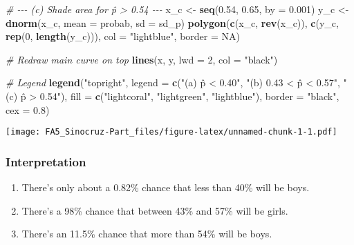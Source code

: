 \documentclass[
]{article}
\newenvironment{Shaded}{\begin{snugshade}}{\end{snugshade}}
\newcommand{\AttributeTok}[1]{\textcolor[rgb]{0.13,0.29,0.53}{#1}}
\newcommand{\CommentTok}[1]{\textcolor[rgb]{0.56,0.35,0.01}{\textit{#1}}}
\newcommand{\ConstantTok}[1]{\textcolor[rgb]{0.56,0.35,0.01}{#1}}
\newcommand{\DecValTok}[1]{\textcolor[rgb]{0.00,0.00,0.81}{#1}}
\newcommand{\FloatTok}[1]{\textcolor[rgb]{0.00,0.00,0.81}{#1}}
\newcommand{\FunctionTok}[1]{\textcolor[rgb]{0.13,0.29,0.53}{\textbf{#1}}}
\newcommand{\NormalTok}[1]{#1}
\newcommand{\OtherTok}[1]{\textcolor[rgb]{0.56,0.35,0.01}{#1}}
\newcommand{\StringTok}[1]{\textcolor[rgb]{0.31,0.60,0.02}{#1}}
\begin{document}
\begin{Shaded}
\begin{Highlighting}[]
\CommentTok{\# {-}{-}{-} (c) Shade area for p̂ \textgreater{} 0.54 {-}{-}{-}}
\NormalTok{x\_c }\OtherTok{\textless{}{-}} \FunctionTok{seq}\NormalTok{(}\FloatTok{0.54}\NormalTok{, }\FloatTok{0.65}\NormalTok{, }\AttributeTok{by =} \FloatTok{0.001}\NormalTok{)}
\NormalTok{y\_c }\OtherTok{\textless{}{-}} \FunctionTok{dnorm}\NormalTok{(x\_c, }\AttributeTok{mean =}\NormalTok{ probab, }\AttributeTok{sd =}\NormalTok{ sd\_p)}
\FunctionTok{polygon}\NormalTok{(}\FunctionTok{c}\NormalTok{(x\_c, }\FunctionTok{rev}\NormalTok{(x\_c)), }\FunctionTok{c}\NormalTok{(y\_c, }\FunctionTok{rep}\NormalTok{(}\DecValTok{0}\NormalTok{, }\FunctionTok{length}\NormalTok{(y\_c))), }\AttributeTok{col =} \StringTok{"lightblue"}\NormalTok{, }\AttributeTok{border =} \ConstantTok{NA}\NormalTok{)}

\CommentTok{\# Redraw main curve on top}
\FunctionTok{lines}\NormalTok{(x, y, }\AttributeTok{lwd =} \DecValTok{2}\NormalTok{, }\AttributeTok{col =} \StringTok{"black"}\NormalTok{)}

\CommentTok{\# Legend}
\FunctionTok{legend}\NormalTok{(}\StringTok{"topright"}\NormalTok{,}
       \AttributeTok{legend =} \FunctionTok{c}\NormalTok{(}\StringTok{"(a) p̂ \textless{} 0.40"}\NormalTok{, }\StringTok{"(b) 0.43 \textless{} p̂ \textless{} 0.57"}\NormalTok{, }\StringTok{"(c) p̂ \textgreater{} 0.54"}\NormalTok{),}
       \AttributeTok{fill =} \FunctionTok{c}\NormalTok{(}\StringTok{"lightcoral"}\NormalTok{, }\StringTok{"lightgreen"}\NormalTok{, }\StringTok{"lightblue"}\NormalTok{),}
       \AttributeTok{border =} \StringTok{"black"}\NormalTok{, }\AttributeTok{cex =} \FloatTok{0.8}\NormalTok{)}
\end{Highlighting}
\end{Shaded}

\texttt{[image: FA5\_Sinocruz-Part\_files/figure-latex/unnamed-chunk-1-1.pdf]}

\subsubsection{Interpretation}\label{interpretation}

\begin{enumerate}
\def\labelenumi{\arabic{enumi}.}
\item
  There's only about a 0.82\% chance that less than 40\% will be boys.
\item
  There's a 98\% chance that between 43\% and 57\% will be girls.
\item
  There's an 11.5\% chance that more than 54\% will be boys.
\end{enumerate}
\end{document}
